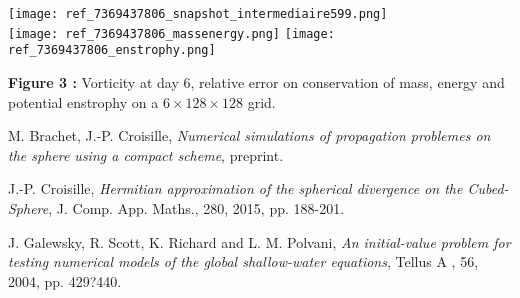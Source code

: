 \documentclass{sciposter}
\begin{document}
\begin{multicols}{2}
\begin{center}
\texttt{[image: ref\_7369437806\_snapshot\_intermediaire599.png]}\\
\texttt{[image: ref\_7369437806\_massenergy.png]}
\texttt{[image: ref\_7369437806\_enstrophy.png]}

\textbf{Figure 3  : } Vorticity at day 6, relative error on conservation of mass, energy and potential enstrophy on a $6 \times 128 \times 128$ grid.
\end{center}



\begin{thebibliography}{99}
 {\sc M. Brachet, J.-P. Croisille}, \textit{Numerical simulations of propagation problemes on the sphere
using a compact scheme}, preprint.

 {\sc J.-P. Croisille}, \textit{Hermitian approximation of the spherical divergence on the Cubed-Sphere}, J.
Comp. App. Maths., 280, 2015, pp. 188-201.

 {\sc J. Galewsky, R. Scott, K. Richard and L. M. Polvani}, \textit{An initial-value problem for testing
numerical models of the global shallow-water equations}, Tellus A , 56, 2004, pp. 429?440.

\end{thebibliography}

\end{multicols}
\end{document}
